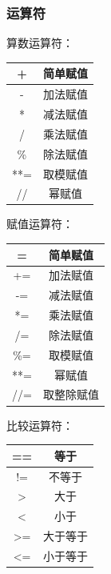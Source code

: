 \documentclass[11pt]{beamer}
\begin{document}
\begin{frame}[fragile]
	\frametitle{运算符}
	\begin{minipage}[t]{0.33\linewidth}
		算数运算符：
		
	\begin{tabular}{|c|c|}
		\hline 
	+	&  简单赋值\\ 
		\hline 
	-	&加法赋值  \\ 
		\hline 
	*	& 减法赋值 \\ 
		\hline 
	/	& 乘法赋值 \\ 
		\hline 
	\%	&  除法赋值\\ 
		\hline 
	**=	&取模赋值  \\ 
		\hline 
	//	&  幂赋值\\ 
		\hline 
	\end{tabular} 
	\end{minipage}%
	\begin{minipage}[t]{0.33\linewidth}
	赋值运算符：
	
	\begin{tabular}{|c|c|}
		\hline 
		=	&  简单赋值\\ 
		\hline 
		+=	&加法赋值  \\ 
		\hline 
		-=	& 减法赋值 \\ 
		\hline 
		*=	& 乘法赋值 \\ 
		\hline 
		/=	&  除法赋值\\ 
		\hline 
		\%=	&取模赋值  \\ 
		\hline 
		**=	&  幂赋值\\ 
		\hline 
		//=	& 取整除赋值 \\ 
		\hline 
	\end{tabular} 
\end{minipage}%
	\begin{minipage}[t]{0.33\linewidth}
		比较运算符：
		
	\begin{tabular}{|c|c|}
	\hline 
	==	&  等于\\ 
	\hline 
	!=	&不等于  \\ 
	\hline 
	>	& 大于 \\ 
	\hline 
	<	&小于  \\ 
	\hline 
	>=	&  大于等于\\ 
	\hline 
	<=	&  小于等于\\ 
	\hline 
\end{tabular} 
	\end{minipage}
\end{frame}
\end{document}
